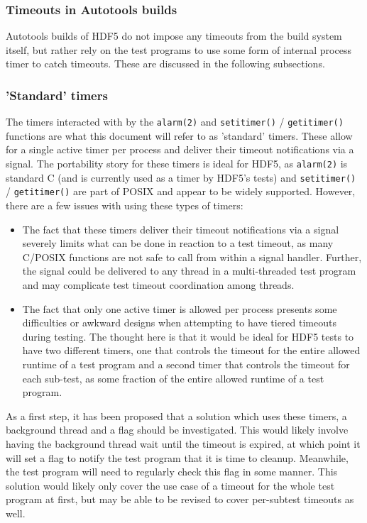 \documentclass[../HDF5_RFC.tex]{subfiles}
\begin{document}
\subsubsection{Timeouts in Autotools builds}

Autotools builds of HDF5 do not impose any timeouts from the build system itself, but rather rely
on the test programs to use some form of internal process timer to catch timeouts. These are discussed
in the following subsections.

\subsubsection{'Standard' timers}

The timers interacted with by the \texttt{alarm(2)} and \texttt{setitimer()} / \texttt{getitimer()}
functions are what this document will refer to as 'standard' timers. These allow for a single active
timer per process and deliver their timeout notifications via a signal. The portability story for
these timers is ideal for HDF5, as \texttt{alarm(2)} is standard C (and is currently used as a timer
by HDF5's tests) and \texttt{setitimer()} / \texttt{getitimer()} are part of POSIX and appear to be
widely supported. However, there are a few issues with using these types of timers:

\begin{itemize}
    \item The fact that these timers deliver their timeout notifications via a signal severely limits
          what can be done in reaction to a test timeout, as many C/POSIX functions are not safe to
          call from within a signal handler. Further, the signal could be delivered to any thread in
          a multi-threaded test program and may complicate test timeout coordination among threads.
    \item The fact that only one active timer is allowed per process presents some difficulties or
          awkward designs when attempting to have tiered timeouts during testing. The thought here is
          that it would be ideal for HDF5 tests to have two different timers, one that controls the
          timeout for the entire allowed runtime of a test program and a second timer that controls
          the timeout for each sub-test, as some fraction of the entire allowed runtime of a test
          program.
\end{itemize}

As a first step, it has been proposed that a solution which uses these timers, a background thread and
a flag should be investigated. This would likely involve having the background thread wait until the
timeout is expired, at which point it will set a flag to notify the test program that it is time to
cleanup. Meanwhile, the test program will need to regularly check this flag in some manner. This solution
would likely only cover the use case of a timeout for the whole test program at first, but may be able
to be revised to cover per-subtest timeouts as well.
\end{document}
